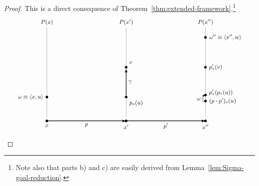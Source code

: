 \begin{proof}
    This is a direct consequence of Theorem~\ref{thm:extended-framework}.\footnote{Note also that parts b) and c) are easily derived from Lemma~\ref{lem:Sigma-goal-reduction}.}
    \[
    \begin{tikzpicture}[
        >=stealth, 
        scale=1.0,
        font=\small,
        every node/.style={scale=0.9},
        dot/.style={circle, fill, inner sep=1.5pt}
        ]
    
        \coordinate (A) at (0,0.3);
        \coordinate (B) at (4,0.3);
        \coordinate (C) at (8,0.3);
    
        \draw[thick, -latex] (A) -- node[below] {$p$} (B);
        \draw[thick, -latex] (B) -- node[below] {$p'$} (C);
        \node[dot, label=below:$x$] at (A) {};
        \node[dot, label=below:$x'$] at (B) {};
        \node[dot, label=below:$x''$] at (C) {};
    
        \draw[gray] (0,0.5) -- (0,5)
            node[above,black] {$P(x)$};
        \draw[gray] (4,0.5) -- (4,5)
            node[above,black] {$P(x')$};
        \draw[gray] (8,0.5) -- (8,5)
            node[above,black] {$P(x'')$};
    
        \node[dot, label=left:{$\omega\equiv\dep{x,u}$}] (u) at (0,1.5) {};
    
        \node[dot, label=below right:{$p_*(u)$}] (pu) at (4,1.5) {};
        \node[dot, label=above right:{$v$}] (v) at (4,3.0) {};
        
        \draw[thick,-latex] (pu) -- node[right] {$\gamma$} (v);
    
        \node[dot, label=right:{$(p\ct p')_*(u)$}] (ppu) at (8,1.3) {};
        \node[circle,
            fill,
            inner sep=1.5pt,
            label={[yshift=4pt]right:{$p'_*(p_*(u))$}}] 
                (pprimeu) at (8,1.6) {};
        \draw[-latex] (ppu) to[out=200,in=200] node[midway, left] {$\omega$} (8,1.6);
        
        \node[dot, label=right:{$p'_*(v)$}] (pv) at (8,3.0) {};
        \node[dot, label=right:{$\omega''\equiv\dep{x'',w}$}] (w) at (8,4.5) {};
    

\end{tikzpicture}\]
\end{proof}
